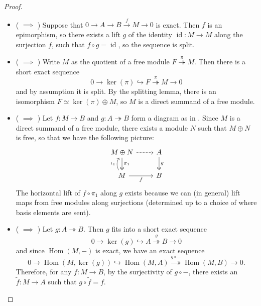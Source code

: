 \documentclass[11pt]{article}
\newcommand{\Hom}{\operatorname{Hom}}
\renewcommand{\ker}{\operatorname{ker}}
\theoremstyle{plain}
\theoremstyle{definition}
\begin{document}
\begin{proof}
\begin{itemize}
    \item ( \(\implies\) ) Suppose that \(0 \to A \to B \overset{f}{\to} M \to 0\) is exact. Then \(f\) is an epimorphism, so there exists a lift \(g\) of the identity \(\operatorname{id} : M \to M\) along the surjection \(f\), such that \(f \circ g = \operatorname{id}\), so the sequence is split.
    \item ( \(\implies\) ) Write \(M\) as the quotient of a free module \(F \overset{\pi}{\twoheadrightarrow} M\). Then there is a short exact sequence
      \[ 0 \to \ker(\pi) \hookrightarrow F \overset{\pi}{\twoheadrightarrow} M \to 0 \]
      and by assumption it is split. By the splitting lemma, there is an isomorphism \(F \simeq \ker(\pi) \oplus M\), so \(M\) is a direct summand of a free module.
    \item ( \(\implies\) ) Let \(f : M \to B\) and \(g : A \twoheadrightarrow B\) form a diagram as in . Since \(M\) is a direct summand of a free module, there exists a module \(N\) such that \(M \oplus N\) is free, so that we have the following picture:
      \[
        \begin{tikzcd}
         M \oplus N \arrow[two heads]{d}{\pi_1} \arrow[dashed]{r} & A \arrow[two heads]{d}{g} \\
         M \arrow[bend left]{u}{\iota_1} \arrow[swap]{r}{f} & B
        \end{tikzcd}
      \]
      The horizontal lift of \(f \circ \pi_1\) along \(g\) exists because we can (in general) lift maps from free modules along surjections (determined up to a choice of where basis elements are sent).
    \item ( \(\implies\) ) Let \(g : A \twoheadrightarrow B\). Then \(g\) fits into a short exact sequence
      \[
        0 \to \ker(g) \hookrightarrow A \overset{g}{\twoheadrightarrow} B \to 0
      \]
      and since \(\Hom(M,-)\) is exact, we have an exact sequence
      \[
        0 \to \Hom(M,\ker(g)) \hookrightarrow \Hom(M, A) \overset{g \circ -}{\twoheadrightarrow} \Hom(M, B) \to 0.
      \]
      Therefore, for any \(f : M \to B\), by the surjectivity of \(g \circ -\), there exists an \(\widetilde{f} : M \to A\) such that \(g \circ \widetilde{f} = f\).
  \end{itemize}
\end{proof}
\end{document}
